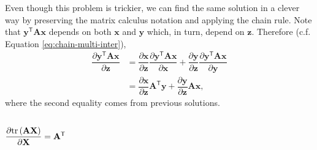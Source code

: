 \documentclass{article}
\newcommand{\trans}{\mathsf{T}}
\begin{document}
Even though this problem is trickier, we can find the same solution in a clever way by preserving the matrix calculus notation and applying the chain rule. Note that \(\mathbf{y}^\trans \mathbf{A} \mathbf{x}\) depends on both \(\mathbf{x}\) and \(\mathbf{y}\) which, in turn, depend on \(\mathbf{z}\). Therefore (c.f. Equation \eqref{eq:chain-multi-inter}),
\begin{align}
    \dfrac{\partial \mathbf{y}^\trans \mathbf{A} \mathbf{x}}{\partial \mathbf{z}} & = \dfrac{\partial \mathbf{x}}{\partial \mathbf{z}} \dfrac{\partial \mathbf{y}^\trans \mathbf{A} \mathbf{x}}{\partial \mathbf{x}} + \dfrac{\partial \mathbf{y}}{\partial \mathbf{z}} \dfrac{\partial \mathbf{y}^\trans \mathbf{A} \mathbf{x}}{\partial \mathbf{y}} \\
    & = \dfrac{\partial \mathbf{x}}{\partial \mathbf{z}} \mathbf{A}^{\trans} \mathbf{y} + \dfrac{\partial \mathbf{y}}{\partial \mathbf{z}} \mathbf{A} \mathbf{x},
\end{align}
where the second equality comes from previous solutions.

\subsection{\(\dfrac{\partial \textnormal{tr}\left(\mathbf{A} \mathbf{X}\right)}{\partial \mathbf{X}} = \mathbf{A}^\trans\)}
\end{document}

